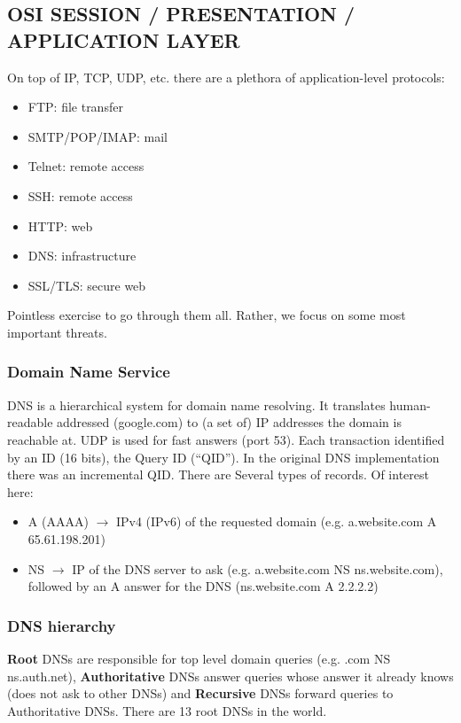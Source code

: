 \documentclass[a4paper, 10pt, titlepage]{article}
\begin{document}

\subsection{OSI SESSION / PRESENTATION / APPLICATION LAYER}
On top of IP, TCP, UDP, etc. there are a plethora of application-level protocols:
\begin{itemize}
	\item FTP: file transfer
	\item SMTP/POP/IMAP: mail
	\item Telnet: remote access
	\item SSH: remote access
	\item HTTP: web
	\item DNS: infrastructure
	\item SSL/TLS: secure web
\end{itemize}
Pointless exercise to go through them all. Rather, we focus on some most important threats.

\subsubsection{Domain Name Service}
DNS is a hierarchical system for domain name resolving. It translates human-readable addressed (google.com) to (a set of) IP addresses the domain is reachable at. UDP is used for fast answers (port 53). Each transaction identified by an ID (16 bits), the Query ID (“QID”). In the original DNS implementation there was an incremental QID. There are Several types of records. Of interest here:
\begin{itemize}
	\item A (AAAA) $\rightarrow$ IPv4 (IPv6) of the requested domain (e.g. a.website.com A 65.61.198.201)
	\item NS $\rightarrow$ IP of the DNS server to ask (e.g. a.website.com NS ns.website.com), followed by an A answer for the DNS (ns.website.com A 2.2.2.2)
\end{itemize}

\subsubsection*{DNS hierarchy}
\textbf{Root} DNSs are responsible for top level domain queries (e.g. .com NS ns.auth.net), \textbf{Authoritative} DNSs answer queries whose answer it already knows (does not ask to other DNSs) and \textbf{Recursive} DNSs forward queries to Authoritative DNSs. There are 13 root DNSs in the world.
\end{document}
